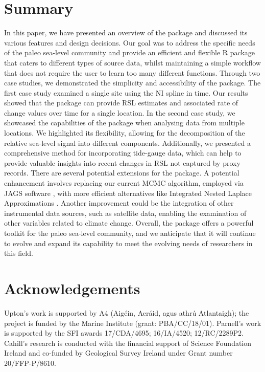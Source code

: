 \section{Summary}\label{summmary}
In this paper, we have presented an overview of the  package and discussed its various features and design decisions. Our goal was to address the specific needs of the paleo sea-level community and provide an efficient and flexible R package that caters to different types of source data, whilst maintaining a simple workflow that does not require the user to learn too many different functions.
Through two case studies, we demonstrated the simplicity and accessibility of the package. The first case study examined a single site using the NI spline in time. Our results showed that the  package can provide RSL estimates and associated rate of change values over time for a single location. In the second case study, we showcased the capabilities of the  package when analysing data from multiple locations. We highlighted its flexibility, allowing for the decomposition of the relative sea-level signal into different components. Additionally, we presented a comprehensive method for incorporating tide-gauge data, which can help to provide valuable insights into recent changes in RSL not captured by proxy records.
There are several potential extensions for the  package. A potential enhancement involves replacing our current MCMC algorithm, employed via JAGS software \citep{plummer2003jags}, with more efficient alternatives like Integrated Nested Laplace Approximations \citep[INLA:][]{rue2009approximate}. Another improvement could be the integration of other instrumental data sources, such as satellite data, enabling the examination of other variables related to climate change. Overall, the  package offers a powerful toolkit for the paleo sea-level community, and we anticipate that it will continue to evolve and expand its capability to meet the evolving needs of researchers in this field.
\section{Acknowledgements}\label{acknowledgements}
Upton's work is supported by A4 (Aigéin, Aeráid, agus athrú Atlantaigh); the project is funded by the Marine Institute (grant: PBA/CC/18/01). Parnell's work is supported by the SFI awards 17/CDA/4695; 16/IA/4520; 12/RC/2289P2. Cahill's research is conducted with the financial support of Science Foundation Ireland and co-funded by Geological Survey Ireland under Grant number 20/FFP-P/8610.
